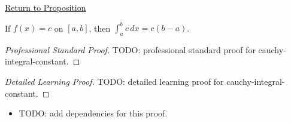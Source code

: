 \newpage
{}
\label{prf:cauchy-integral-constant}
\begin{remark*}[Return]\hyperref[prop:cauchy-integral-constant]{Return to Proposition}\end{remark*}

\begin{proposition*}
If \(f(x)=c\) on \([a,b]\), then \(\int_a^b c\,dx=c(b-a)\).
\end{proposition*}

\begin{proof}[Professional Standard Proof]
\LRAProofBodyStart
TODO: professional standard proof for cauchy-integral-constant.
\end{proof}

\begin{proof}[Detailed Learning Proof]
\LRAProofBodyStart
TODO: detailed learning proof for cauchy-integral-constant.
\end{proof}

\begin{remark*}
\end{remark*}

\begin{dependencies}
\begin{itemize}
  \item TODO: add dependencies for this proof.
\end{itemize}
\end{dependencies}

\clearpage
